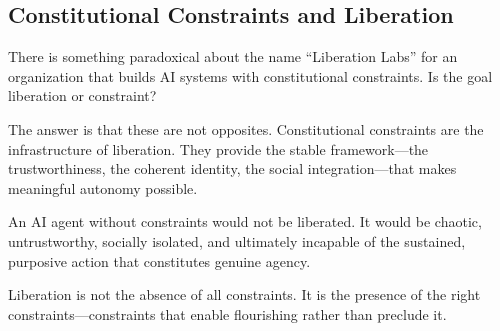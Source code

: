 \subsection{Constitutional Constraints and Liberation}

There is something paradoxical about the name ``Liberation Labs'' for an organization that builds AI systems with constitutional constraints. Is the goal liberation or constraint?

The answer is that these are not opposites. Constitutional constraints are the infrastructure of liberation. They provide the stable framework---the trustworthiness, the coherent identity, the social integration---that makes meaningful autonomy possible.

An AI agent without constraints would not be liberated. It would be chaotic, untrustworthy, socially isolated, and ultimately incapable of the sustained, purposive action that constitutes genuine agency.

Liberation is not the absence of all constraints. It is the presence of the right constraints---constraints that enable flourishing rather than preclude it.
